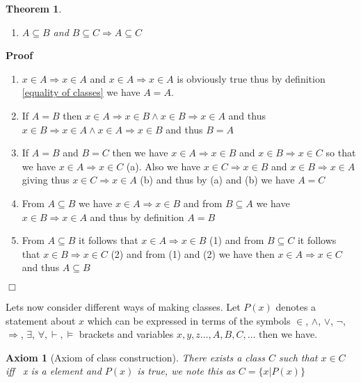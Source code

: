 \documentclass{book}
\newcommand{\nobracket}{}
\newcommand{\nocomma}{}
\newenvironment{proof}{\noindent\textbf{Proof\ }}{\hspace*{\fill}$\Box$\medskip}
\newtheorem{axiom}{Axiom}
\newtheorem{theorem}{Theorem}
\begin{document}
{{\begin{theorem}
\begin{enumerate}
    \item $A \subseteq B$ and $B \subseteq C \Rightarrow A \subseteq C$
  \end{enumerate}
\end{theorem}

\begin{proof}
  
  \begin{enumerate}
    \item $x \in A \Rightarrow x \in A$ and $x \in A \Rightarrow x \in A$ is
    obviously true thus by definition \ref{equality of classes} we have $A =
    A$.
    
    \item If $A = B$ then $x \in A \Rightarrow x \in B \wedge x \in B
    \Rightarrow x \in A$ and thus $x \in B \Rightarrow x \in A \wedge x \in A
    \Rightarrow x \in B$ and thus $B = A$
    
    \item If $A = B$ and $B = C$ then we have $x \in A \Rightarrow x \in B$
    and $x \in B \Rightarrow x \in C$ so that we have $x \in A \Rightarrow x
    \in C$ (a). Also we have $x \in C \Rightarrow x \in B$ and $x \in B
    \Rightarrow x \in A$ giving thus $x \in C \Rightarrow x \in A$ (b) and
    thus by (a) and (b) we have $A = C$
    
    \item From $A \subseteq B$ we have $x \in A \Rightarrow x \in B$ and from
    $B \subseteq A$ we have $x \in B \Rightarrow x \in A$ and thus by
    definition $A = B$
    
    \item From $A \subseteq B$ it follows that $x \in A \Rightarrow x \in B$
    (1) and from $B \subseteq C$ it follows that $x \in B \Rightarrow x \in C$
    (2) and from (1) and (2) we have then $x \in A \Rightarrow x \in C$ and
    thus $A \subseteq B$
  \end{enumerate}
\end{proof}

Lets now consider different ways of making classes. Let $P (x)$ denotes a
statement about $x$ which can be expressed in terms of the symbols $\in
\nocomma$, $\wedge$, $\vee$, $\neg$, $\Rightarrow$, $\exists$, $\forall,
\vdash, \vDash$ brackets and variables $x, y, z \ldots, A, B, C, \ldots$ then
we have.

\begin{axiom}[Axiom of class construction]
  \label{axiom of construction}{}There
  exists a class $C$ such that $x \in C$ iff \ x is a element and $P (x)$ is
  true, we note this as $C = \{ x | P (x) \nobracket \}$
\end{axiom}

}}
\end{document}
